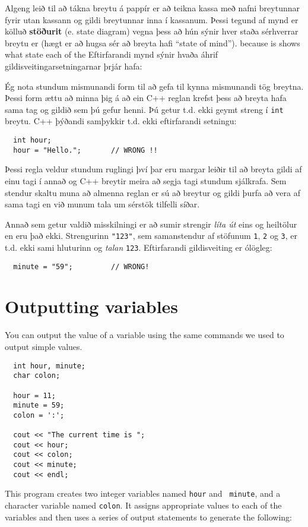 Algeng leið til að tákna breytu á pappír er að teikna kassa
með nafni breytunnar fyrir utan kassann og gildi breytunnar inna í kassanum.
Þessi tegund af mynd er kölluð {\bf stöðurit} (e. state diagram) vegna þess að hún sýnir hver staða sérhverrar breytu er (hægt er að hugsa sér að breyta hafi ``state of mind'').
because is shows what state each of the
Eftirfarandi mynd sýnir hvaða áhrif gildisveitingarsetningarnar þrjár hafa: 

\vspace{0.1in}
\centerline{}
\vspace{0.1in}

Ég nota stundum mismunandi form til að gefa til kynna mismunandi tög breytna.
Þessi form ættu að minna þig á að ein C++ reglan krefst þess að breyta hafa sama tag og gildið sem þú gefur henni.
Þú getur t.d. ekki geymt streng í {\tt int} breytu.
C++ þýðandi samþykkir t.d. ekki eftirfarandi setningu: 

\begin{verbatim}
  int hour;
  hour = "Hello.";       // WRONG !!
\end{verbatim}
%
Þessi regla veldur stundum ruglingi því þar eru margar leiðir til að breyta gildi af einu tagi í annað og C++ breytir meira að segja tagi stundum sjálkrafa.
Sem stendur skaltu muna að almenna reglan er sú að breytur og gildi þurfa að vera af sama tagi en við munum tala um sérstök tilfelli síðar.

Annað sem getur valdið misskilningi er að sumir strengir {\em líta út} eins og heiltölur en eru það ekki.
Strengurinn {\tt "123"}, sem samanstendur af stöfunum {\tt 1}, {\tt 2} og {\tt 3}, er t.d. ekki sami hluturinn og {\em talan} {\tt 123}.
Eftirfarandi gildisveiting er ólögleg:

\begin{verbatim}
  minute = "59";         // WRONG!
\end{verbatim}
%
\section{Outputting variables}
\label{output}

You can output the value of a variable using the same commands
we used to output simple values.

\begin{verbatim}
  int hour, minute;
  char colon;

  hour = 11;
  minute = 59;
  colon = ':';

  cout << "The current time is ";
  cout << hour;
  cout << colon;
  cout << minute;
  cout << endl;
\end{verbatim}
%
This program creates two integer variables named {\tt hour} and {\tt
minute}, and a character variable named {\tt colon}.  It assigns
appropriate values to each of the variables and then uses a series
of output statements to generate the following:

